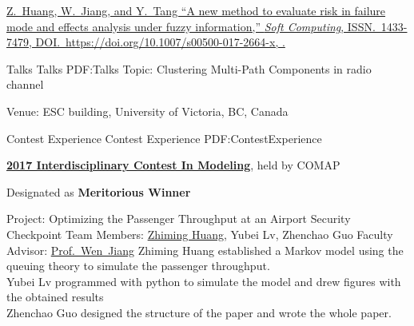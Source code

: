 \documentclass[letterpaper,MMMyyyy,nonstopmode]{simpleresumecv}
\begin{document}
\begin{Body}
\Gap
\NumberedItem{[5]}
\href{https://doi.org/10.1007/s00500-017-2664-x}
{\underline{Z.~Huang}, W.~Jiang, and Y.~Tang
``A new method to evaluate risk in failure mode and effects analysis under fuzzy information,''
\textit{Soft Computing},
ISSN.~1433-7479,
DOI.~https://doi.org/10.1007/s00500-017-2664-x,
.}

\endgroup

\BigGap
\SubSection
{Talks}
{Talks}
{PDF:Talks}
\BulletItem
Topic: Clustering Multi-Path Components in radio channel
\hfill
{}
\begin{Detail}
\SubBulletItem
Venue:
ESC building, University of Victoria, BC, Canada
\end{Detail}







\Section
{Contest Experience}
{Contest Experience}
{PDF:ContestExperience}

\Entry
\href{http://www.comap.com/undergraduate/contests/}
{\textbf{2017 Interdisciplinary Contest In Modeling}},
held by COMAP

\Gap
\BulletItem
Designated as \textbf{Meritorious Winner}
\hfill
\begin{Detail}
\SubBulletItem
Project:
Optimizing the Passenger Throughput at an Airport Security Checkpoint
\SubBulletItem
Team Members:
\underline{Zhiming Huang}, Yubei Lv, Zhenchao Guo
\SubBulletItem
Faculty Advisor:
\href{http://teacher.nwpu.edu.cn/jiangwen.html}
{Prof.~Wen~Jiang}
\SubBulletItem
Zhiming Huang established a Markov model using the queuing theory to simulate the passenger throughput.\\
Yubei Lv programmed with python to simulate the model and drew figures with the obtained results\\
Zhenchao Guo designed the structure of the paper and wrote the whole paper.
\end{Detail}



\end{Body}
\end{document}
